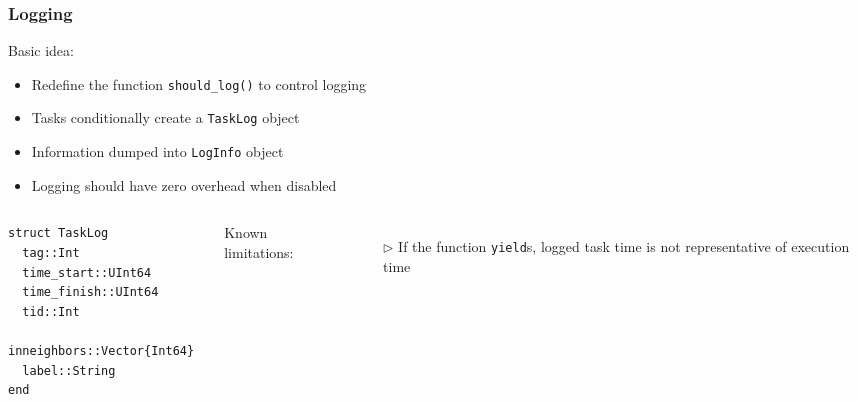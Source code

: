 \documentclass{beamer}
\begin{document}
\begin{frame}[fragile]
\frametitle{Logging}

Basic idea:
\begin{itemize}
  \item Redefine the function
  \texttt{should_log()} to control logging
  \item Tasks conditionally create a \texttt{TaskLog} object
  \item Information dumped into \texttt{LogInfo} object
  \item Logging should have zero overhead when disabled
\end{itemize}

\hrulefill

\begin{columns}


\begin{verbatim}
struct TaskLog
  tag::Int
  time_start::UInt64
  time_finish::UInt64
  tid::Int
  inneighbors::Vector{Int64}
  label::String
end
\end{verbatim}


Known limitations:
\begin{itemize}
  \item[$\triangleright$] If the function \texttt{yield}s, logged task time is
  not representative of execution time
\end{itemize}

\end{columns}

\end{frame}



\end{document}
